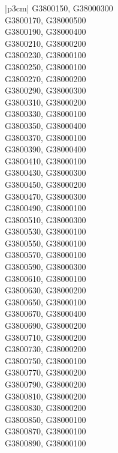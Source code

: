 \begin{customLongTable}{ |p{3cm}| }
G3800150, G38000300 \\ \hline
G3800170, G38000500 \\ \hline
G3800190, G38000400 \\ \hline
G3800210, G38000200 \\ \hline
G3800230, G38000100 \\ \hline
G3800250, G38000100 \\ \hline
G3800270, G38000200 \\ \hline
G3800290, G38000300 \\ \hline
G3800310, G38000200 \\ \hline
G3800330, G38000100 \\ \hline
G3800350, G38000400 \\ \hline
G3800370, G38000100 \\ \hline
G3800390, G38000400 \\ \hline
G3800410, G38000100 \\ \hline
G3800430, G38000300 \\ \hline
G3800450, G38000200 \\ \hline
G3800470, G38000300 \\ \hline
G3800490, G38000100 \\ \hline
G3800510, G38000300 \\ \hline
G3800530, G38000100 \\ \hline
G3800550, G38000100 \\ \hline
G3800570, G38000100 \\ \hline
G3800590, G38000300 \\ \hline
G3800610, G38000100 \\ \hline
G3800630, G38000200 \\ \hline
G3800650, G38000100 \\ \hline
G3800670, G38000400 \\ \hline
G3800690, G38000200 \\ \hline
G3800710, G38000200 \\ \hline
G3800730, G38000200 \\ \hline
G3800750, G38000100 \\ \hline
G3800770, G38000200 \\ \hline
G3800790, G38000200 \\ \hline
G3800810, G38000200 \\ \hline
G3800830, G38000200 \\ \hline
G3800850, G38000100 \\ \hline
G3800870, G38000100 \\ \hline
G3800890, G38000100 \\ \hline

\end{customLongTable}
